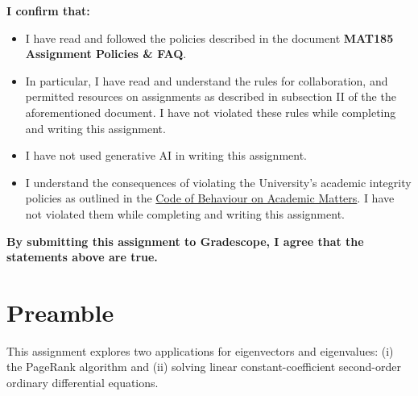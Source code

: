 \documentclass[10pt,answers]{exam}
\begin{document}
\bigskip
\large \textbf{I confirm that:}
\normalsize

\begin{itemize} 
\item I have read and followed the policies described in the document {\bf
    MAT185 Assignment Policies \& FAQ}.
\item In particular, I have read and understand the rules for
  collaboration, and permitted resources on assignments as described in
  subsection II of the the aforementioned document. I have not violated
  these rules while completing and writing this assignment.
\item I have not used generative AI in writing this assignment.
\item I understand the consequences of violating the University's academic
  integrity policies as outlined in the
  \href{http://www.governingcouncil.utoronto.ca/policies/behaveac.htm}{Code of
    Behaviour on Academic Matters}. I have not violated them while completing
  and writing this assignment.
\end{itemize}
\bigskip

\large \textbf{By submitting this assignment to Gradescope, I agree that the
  statements above are true.}  \normalsize


\newpage

\section*{Preamble}

This assignment explores two applications for eigenvectors and eigenvalues:
(i) the PageRank algorithm and (ii) solving linear constant-coefficient second-order ordinary differential
equations.

\vspace{.2cm}
\end{document}
